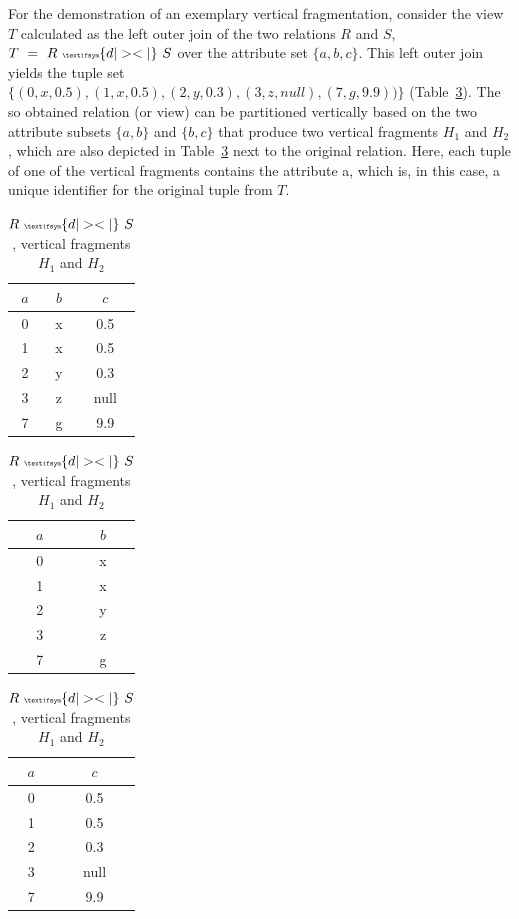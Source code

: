 \begin{exmp}
For the demonstration of an exemplary vertical fragmentation, consider the view $T$ calculated as the left outer join of the two relations $R$ and $S$, 
$T~=~R~{\tiny \textifsym{d|><|}}~S$ over the attribute set $\{a,b,c\}$. 
This left outer join yields the tuple set $\{(0,x,0.5), (1,x,0.5), (2,y,0.3), (3,z,null), (7,g,9.9))\}$ (Table~\ref{tab:join_vert_frag}). The so obtained
relation (or view) can be partitioned vertically based on the two attribute subsets $\{a,b\}$ and $\{b,c\}$ that produce two vertical fragments $H_1$ and 
$H_2$, which are also depicted in Table~\ref{tab:join_vert_frag} next to the original relation. Here, each tuple of one of the vertical fragments contains 
the attribute a, which is, in this case, a unique identifier for the original tuple from $T$.

\begin{table}[h]
    \centering
    \begin{tabular}{c|c|c}
        $a$ & $b$ & $c$ \\
        \hline
        0 & x & 0.5 \\
        1 & x & 0.5 \\
        2 & y & 0.3 \\
        3 & z & null \\
        7 & g & 9.9 \\
    \end{tabular}
    \hspace{20pt}
    \begin{tabular}{c|c}
        $a$ & $b$ \\
        \hline
        0 & x \\
        1 & x \\
        2 & y \\
        3 & z \\
        7 & g \\
    \end{tabular}
    \hspace{5pt}
    \begin{tabular}{c|c}
        $a$ & $c$ \\
        \hline
        0 & 0.5 \\
        1 & 0.5 \\
        2 & 0.3 \\
        3 & null \\
        7 & 9.9 \\
    \end{tabular}
    \caption{$R~{\tiny \textifsym{d|><|}}~S$, vertical fragments $H_1$ and $H_2$}
    \label{tab:join_vert_frag}
\end{table}

\end{exmp}



